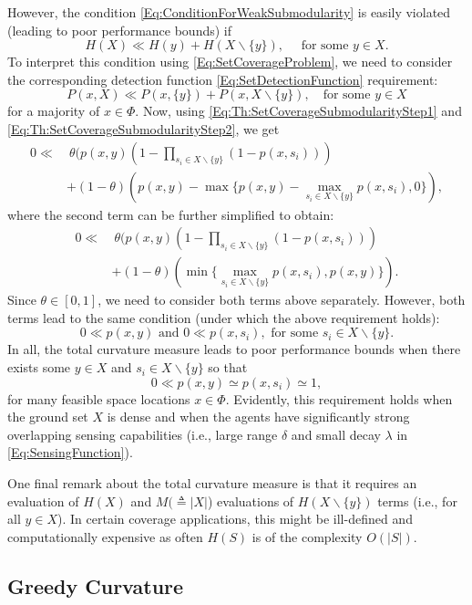 \documentclass[letterpaper, 10 pt, conference]{ieeeconf}
\begin{document}
However, the condition \eqref{Eq:ConditionForWeakSubmodularity} is easily violated (leading to poor performance bounds) if 
$$
H(X) \ll H(y) + H(X\backslash \{y\}), \quad \mbox{ for some } y\in X. 
$$
To interpret this condition using \eqref{Eq:SetCoverageProblem}, we need to consider the corresponding detection function \eqref{Eq:SetDetectionFunction} requirement: 
$$
P(x,X) \ll P(x,\{y\}) + P(x,X\backslash \{y\}), \quad \mbox{for some } y\in X
$$
for a majority of $x\in\Phi$. Now, using \eqref{Eq:Th:SetCoverageSubmodularityStep1} and \eqref{Eq:Th:SetCoverageSubmodularityStep2}, we get 
\begin{align*}
0\ll&\ \theta(p(x,y)(1-\prod_{s_i\in X\backslash \{y\}}(1-p(x,s_i)))\\
&+(1-\theta) (p(x,y)-\max\{p(x,y)-\max_{s_i\in X\backslash \{y\}}p(x,s_i),0\}),
\end{align*}
where the second term can be further simplified to obtain:
\begin{align*}
0\ll&\ \theta(p(x,y)(1-\prod_{s_i\in X\backslash \{y\}}(1-p(x,s_i)))\\
&+(1-\theta) (\min\{\max_{s_i\in X\backslash \{y\}}p(x,s_i),p(x,y)\}).  
\end{align*}
Since $\theta \in [0,1]$, we need to consider both terms above separately. However, both terms lead to the same condition (under which the above requirement holds):
$$0 \ll p(x,y) \mbox{ and } 0 \ll p(x,s_i), \mbox{ for some } s_i \in X\backslash \{y\}.$$
In all, the total curvature measure leads to poor performance bounds when there exists some $y\in X$ and $s_i\in X\backslash \{y\}$ so that 
$$0\ll p(x,y) \simeq p(x,s_i) \simeq 1,$$
for many feasible space locations $x\in \Phi$. Evidently, this requirement holds when the ground set $X$ is dense and when the agents have significantly strong overlapping sensing capabilities (i.e., large range $\delta$ and small decay $\lambda$ in \eqref{Eq:SensingFunction}).

One final remark about the total curvature measure is that it requires an evaluation of $H(X)$ and $M(\triangleq \vert X\vert$) evaluations of $H(X\backslash \{y\})$ terms (i.e., for all $y\in X$). In certain coverage applications, this might be ill-defined \cite{Sun2020} and computationally expensive as often $H(S)$ is of the complexity $O(\vert S \vert)$.


\subsection{Greedy Curvature \cite{Conforti1984}}
\label{SubSec:GreedyCurvature}
\end{document}
